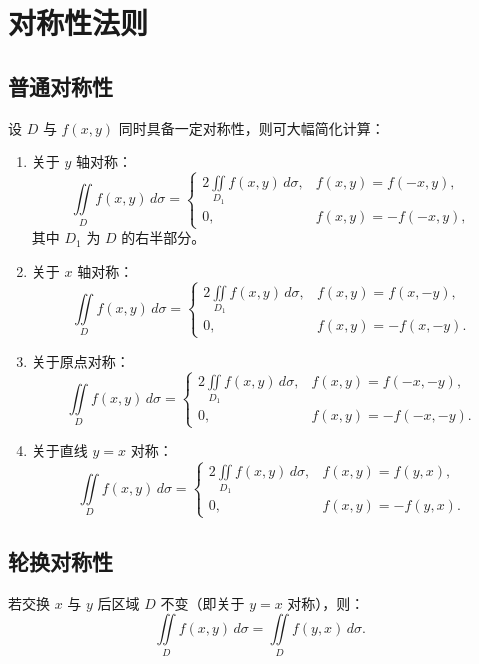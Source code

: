 \section{对称性法则}

\subsection{普通对称性}
设 $D$ 与 $f(x,y)$ 同时具备一定对称性，则可大幅简化计算：

\begin{enumerate}
    \item 关于 $y$ 轴对称：
          \[
              \iint\limits_D f(x,y)\,d\sigma =
              \begin{cases}
                  2\iint\limits_{D_1} f(x,y)\,d\sigma, & f(x,y)=f(-x,y),  \\[4pt]
                  0,                                   & f(x,y)=-f(-x,y),
              \end{cases}
          \]
          其中 $D_1$ 为 $D$ 的右半部分。
    \item 关于 $x$ 轴对称：
          \[
              \iint\limits_D f(x,y)\,d\sigma =
              \begin{cases}
                  2\iint\limits_{D_1} f(x,y)\,d\sigma, & f(x,y)=f(x,-y),  \\[4pt]
                  0,                                   & f(x,y)=-f(x,-y).
              \end{cases}
          \]
    \item 关于原点对称：
          \[
              \iint\limits_D f(x,y)\,d\sigma =
              \begin{cases}
                  2\iint\limits_{D_1} f(x,y)\,d\sigma, & f(x,y)=f(-x,-y),  \\[4pt]
                  0,                                   & f(x,y)=-f(-x,-y).
              \end{cases}
          \]
    \item 关于直线 $y = x$ 对称：
          \[
              \iint\limits_D f(x,y)\,d\sigma =
              \begin{cases}
                  2\iint\limits_{D_1} f(x,y)\,d\sigma, & f(x,y)=f(y,x),  \\[4pt]
                  0,                                   & f(x,y)=-f(y,x).
              \end{cases}
          \]
\end{enumerate}

\subsection{轮换对称性}
若交换 $x$ 与 $y$ 后区域 $D$ 不变（即关于 $y=x$ 对称），则：
\[
    \iint\limits_D f(x,y)\,d\sigma = \iint\limits_D f(y,x)\,d\sigma.
\]

